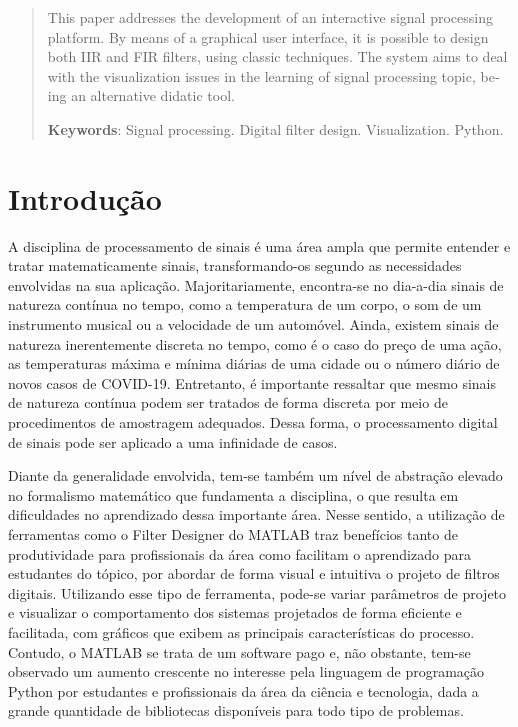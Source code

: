 \documentclass[12pt,a4paper]{report}
\begin{document}
\begin{otherlanguage}{english}
  \begin{abstract}
    This paper addresses the development of an interactive signal processing platform. By means of a graphical
    user interface, it is possible to design both IIR and FIR filters, using classic techniques. The system
    aims to deal with the visualization issues in the learning of signal processing topic, being an alternative
    didatic tool.

    \textbf{Keywords}: Signal processing. Digital filter design. Visualization. Python.
  \end{abstract}
\end{otherlanguage}

{
  \center
  \listoffigures
  \pagestyle{empty}
  \clearpage
}

{
  \center
  \tableofcontents
  \thispagestyle{empty}
  \clearpage
}

\chapter{Introdução}
  A disciplina de processamento de sinais é uma área ampla que permite entender e tratar matematicamente
  sinais, transformando-os segundo as necessidades envolvidas na sua aplicação. Majoritariamente, encontra-se
  no dia-a-dia sinais de natureza contínua no tempo, como a temperatura de um corpo, o som de um instrumento
  musical ou a velocidade de um automóvel. Ainda, existem sinais de natureza inerentemente discreta no tempo,
  como é o caso do preço de uma ação, as temperaturas máxima e mínima diárias de uma cidade ou o número diário
  de novos casos de COVID-19. Entretanto, é importante ressaltar que mesmo sinais de natureza contínua  podem
  ser tratados de forma discreta por meio de procedimentos de amostragem adequados. Dessa forma, o processamento
  digital de sinais pode ser aplicado a uma infinidade de casos.

  Diante da generalidade envolvida, tem-se também um nível de abstração elevado no formalismo matemático que
  fundamenta a disciplina, o que resulta em dificuldades no aprendizado dessa importante área. Nesse sentido,
  a utilização de ferramentas como o Filter Designer do MATLAB traz benefícios tanto de produtividade para
  profissionais da área como facilitam o aprendizado para estudantes do tópico, por abordar de forma visual e
  intuitiva o projeto de filtros digitais. Utilizando esse tipo de ferramenta, pode-se variar parâmetros de
  projeto e visualizar o comportamento dos sistemas projetados de forma eficiente e facilitada, com gráficos que
  exibem as principais características do processo. Contudo, o MATLAB se trata de um software pago e, não
  obstante, tem-se observado um aumento crescente no interesse pela linguagem de programação Python por
  estudantes e profissionais da área da ciência e tecnologia, dada a grande quantidade de bibliotecas disponíveis
  para todo tipo de problemas.
\end{document}
